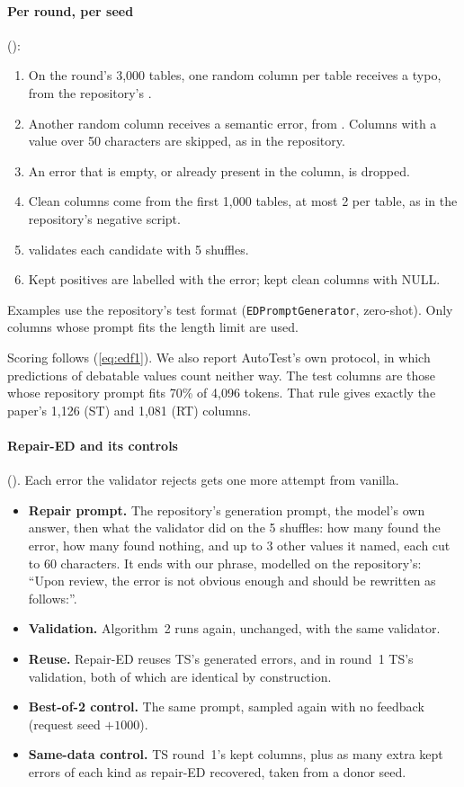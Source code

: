 \paragraph{Per round, per seed} ():
\begin{enumerate}
\item On the round's 3,000 tables, one random column per table receives a typo, from the repository's
.
\item Another random column receives a semantic error, from . Columns with a
value over 50 characters are skipped, as in the repository.
\item An error that is empty, or already present in the column, is dropped.
\item Clean columns come from the first 1,000 tables, at most 2 per table, as in the repository's negative script.
\item {} validates each candidate with 5 shuffles.
\item Kept positives are labelled with the error; kept clean columns with NULL.
\end{enumerate}
Examples use the repository's test format (\texttt{EDPromptGenerator}, zero-shot). Only columns whose prompt fits the
length limit are used.

Scoring follows  (\cref{eq:edf1}). We also report AutoTest's own protocol, in which predictions
of debatable values count neither way. The test columns are those whose repository prompt fits 70\% of 4,096 tokens.
That rule gives exactly the paper's 1,126 (ST) and 1,081 (RT) columns.

\paragraph{Repair-ED and its controls} (). Each error the validator rejects gets one more
attempt from vanilla.
\begin{itemize}
\item \textbf{Repair prompt.} The repository's generation prompt, the model's own answer, then what the validator did
on the 5 shuffles: how many found the error, how many found nothing, and up to 3 other values it named, each cut to 60
characters. It ends with our phrase, modelled on the repository's: ``Upon review, the error is not obvious enough and
should be rewritten as follows:''.
\item \textbf{Validation.} Algorithm~2 runs again, unchanged, with the same validator.
\item \textbf{Reuse.} Repair-ED reuses TS's generated errors, and in round~1 TS's validation, both of which are
identical by construction.
\item \textbf{Best-of-2 control.} The same prompt, sampled again with no feedback (request seed $+1000$).
\item \textbf{Same-data control.} TS round~1's kept columns, plus as many extra kept errors of each kind as repair-ED
recovered, taken from a donor seed.
\end{itemize}

